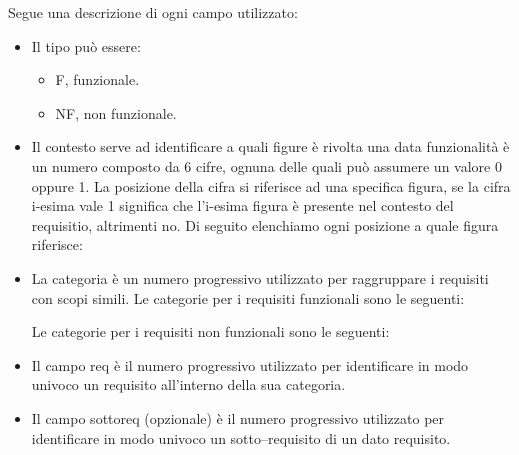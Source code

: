 Segue una descrizione di ogni campo utilizzato:
\begin{itemize}
\item Il tipo può essere:
\begin{itemize}
	\item F, funzionale.
	\item NF, non funzionale.
\end{itemize}

\item Il contesto serve ad identificare a quali figure è rivolta una data funzionalità è un numero composto da 6 cifre, ognuna delle quali può assumere un valore 0 oppure 1. La posizione della cifra si riferisce ad una specifica figura, se la cifra i-esima vale 1 significa che l'i-esima figura è presente nel contesto del requisitio, altrimenti no.
Di seguito elenchiamo ogni posizione a quale figura riferisce: 

\item La categoria è un numero progressivo utilizzato per raggruppare i requisiti con scopi simili.
Le categorie per i requisiti funzionali sono le seguenti:
Le categorie per i requisiti non funzionali sono le seguenti:

\item Il campo req è il numero progressivo utilizzato per identificare in modo univoco un requisito all'interno della sua categoria.
\item Il campo sottoreq (opzionale) è il numero progressivo utilizzato per identificare in modo univoco un sotto--requisito di un dato requisito.

\end{itemize}
